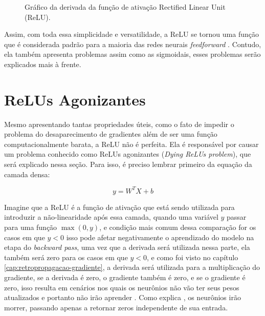 \begin{figure}[h!] %
    \centering %
        \caption{Gráfico da derivada da função de ativação Rectified Linear Unit (ReLU).}
    \label{fig:relu-derivada}
\end{figure}

Assim, com toda essa simplicidade e versatilidade, a ReLU se tornou uma função que é considerada padrão para a maioria das redes neurais \textit{feedforward} \parencite{DeepLearningBook}. Contudo, ela também apresenta problemas assim como as sigmoidais, esses problemas serão explicados mais à frente.

\section{ReLUs Agonizantes}

Mesmo apresentando tantas propriedades úteis, como o fato de impedir o problema do desaparecimento de gradientes além de ser uma função computacionalmente barata, a ReLU não é perfeita. Ela é responsável por causar um problema conhecido como ReLUs agonizantes (\textit{Dying ReLUs problem}), que será explicado nessa seção. Para isso, é preciso lembrar primeiro da equação da camada densa:

\[
    y = W^T  X + b
\]

Imagine que a ReLU é a função de ativação que está sendo utilizada para introduzir a não-linearidade após essa camada, quando uma variável $y$ passar para uma função $\max(0, y)$, e condição mais comum dessa comparação for os casos em que $y < 0$ isso pode afetar negativamente o aprendizado do modelo na etapa do \textit{backward pass}, uma vez que a derivada será utilizada nessa parte, ela também será zero para os casos em que $y < 0$, e como foi visto no capítulo \ref{cap:retropropagacao-gradiente}, a derivada será utilizada para a multiplicação do gradiente, se a derivada é zero, o gradiente também é zero, e se o gradiente é zero, isso resulta em cenários nos quais os neurônios não vão ter seus pesos atualizados e portanto não irão aprender \parencite{DyingReluDouglas}. Como explica \textcite{DyingReluDouglas}, os neurônios irão morrer, passando apenas a retornar zeros independente de sua entrada.

